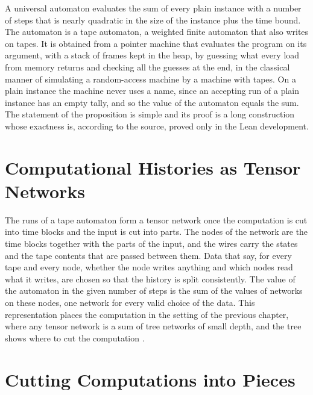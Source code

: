 \documentclass[11pt,letterpaper]{report}
\theoremstyle{plain}
\theoremstyle{definition}
\theoremstyle{remark}
\begin{document}
A universal automaton evaluates the sum of every plain instance with a number of steps that is nearly quadratic in the size of the instance plus the time bound. The automaton is a tape automaton, a weighted finite automaton that also writes on tapes. It is obtained from a pointer machine that evaluates the program on its argument, with a stack of frames kept in the heap, by guessing what every load from memory returns and checking all the guesses at the end, in the classical manner of simulating a random-access machine by a machine with tapes. On a plain instance the machine never uses a name, since an accepting run of a plain instance has an empty tally, and so the value of the automaton equals the sum. The statement of the proposition is simple and its proof is a long construction whose exactness is, according to the source, proved only in the Lean development.

\section{Computational Histories as Tensor Networks}

The runs of a tape automaton form a tensor network once the computation is cut into time blocks and the input is cut into parts. The nodes of the network are the time blocks together with the parts of the input, and the wires carry the states and the tape contents that are passed between them. Data that say, for every tape and every node, whether the node writes anything and which nodes read what it writes, are chosen so that the history is split consistently. The value of the automaton in the given number of steps is the sum of the values of networks on these nodes, one network for every valid choice of the data. This representation places the computation in the setting of the previous chapter, where any tensor network is a sum of tree networks of small depth, and the tree shows where to cut the computation \cite{Source2026}.

\section{Cutting Computations into Pieces}
\end{document}
